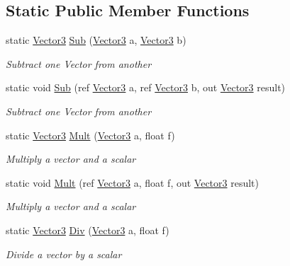 \subsection*{Static Public Member Functions}
\begin{DoxyCompactItemize}
\item 
static \hyperlink{struct_open_t_k_1_1_vector3}{Vector3} \hyperlink{struct_open_t_k_1_1_vector3_a73b4bcbba84b4aacf3b45dece3a11430}{Sub} (\hyperlink{struct_open_t_k_1_1_vector3}{Vector3} a, \hyperlink{struct_open_t_k_1_1_vector3}{Vector3} b)
\begin{DoxyCompactList}\small\item\em Subtract one Vector from another \end{DoxyCompactList}\item 
static void \hyperlink{struct_open_t_k_1_1_vector3_a93def1ba5758d48d3902a901e7345115}{Sub} (ref \hyperlink{struct_open_t_k_1_1_vector3}{Vector3} a, ref \hyperlink{struct_open_t_k_1_1_vector3}{Vector3} b, out \hyperlink{struct_open_t_k_1_1_vector3}{Vector3} result)
\begin{DoxyCompactList}\small\item\em Subtract one Vector from another \end{DoxyCompactList}\item 
static \hyperlink{struct_open_t_k_1_1_vector3}{Vector3} \hyperlink{struct_open_t_k_1_1_vector3_aa58aaf1ba7b6c02dbabaa11fb1fa4e30}{Mult} (\hyperlink{struct_open_t_k_1_1_vector3}{Vector3} a, float f)
\begin{DoxyCompactList}\small\item\em Multiply a vector and a scalar \end{DoxyCompactList}\item 
static void \hyperlink{struct_open_t_k_1_1_vector3_a9391c1b8fd3cb6889381b51df2389748}{Mult} (ref \hyperlink{struct_open_t_k_1_1_vector3}{Vector3} a, float f, out \hyperlink{struct_open_t_k_1_1_vector3}{Vector3} result)
\begin{DoxyCompactList}\small\item\em Multiply a vector and a scalar \end{DoxyCompactList}\item 
static \hyperlink{struct_open_t_k_1_1_vector3}{Vector3} \hyperlink{struct_open_t_k_1_1_vector3_adcee425d5256151063c60587ca759744}{Div} (\hyperlink{struct_open_t_k_1_1_vector3}{Vector3} a, float f)
\begin{DoxyCompactList}\small\item\em Divide a vector by a scalar \end{DoxyCompactList}\item 

\end{DoxyCompactItemize}
